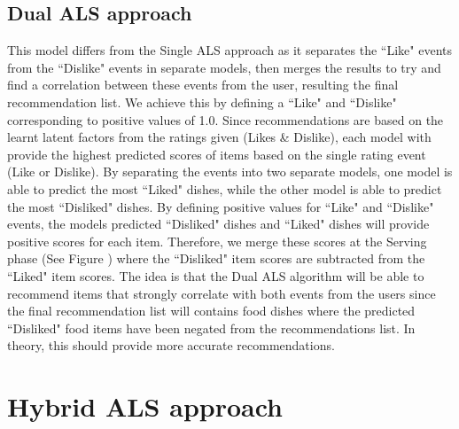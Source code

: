 \subsection{Dual ALS approach} 

This model differs from the Single ALS approach as it separates the ``Like" events from the ``Dislike" events in separate models, then merges the results to try and find a correlation between these events from the user, resulting the final recommendation list. We achieve this by defining a ``Like" and ``Dislike" corresponding to positive values of 1.0. Since recommendations are based on the learnt latent factors from the ratings given (Likes \& Dislike), each model with provide the highest predicted scores of items based on the single rating event (Like or Dislike). By separating the events into two separate models, one model is able to predict the most ``Liked" dishes, while the other model is able to predict the most ``Disliked" dishes. By defining positive values for ``Like" and ``Dislike" events, the models predicted ``Disliked" dishes and ``Liked" dishes will provide positive scores for each item. Therefore, we merge these scores at the Serving phase (See Figure ) where the ``Disliked" item scores are subtracted from the ``Liked" item scores. The idea is that the Dual ALS algorithm will be able to recommend items that strongly correlate with both events from the users since the final recommendation list will contains food dishes where the predicted ``Disliked" food items have been negated from the recommendations list. In theory, this should provide more accurate recommendations.



\section{Hybrid ALS approach}



